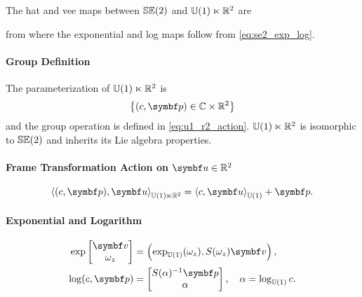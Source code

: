 The hat and vee maps between $\SEtwo$ and $\Uone \ltimes \mathbb{R}^2$ are
\begin{center}
\end{center}
from where the exponential and log maps follow from \eqref{eq:se2_exp_log}.

\begin{properties}[breakable, title={$\Uone\ltimes \mathbb{R}^2$ as a parameterization of $\SEtwo$}]
  \paragraph{Group Definition}
  The parameterization of $\Uone \ltimes \mathbb{R}^2$ is
  \begin{equation}
    \left\{ (c, \bp) \in \mathbb{C} \times \mathbb{R}^2 \right\}
  \end{equation}
  and the group operation is defined in \eqref{eq:u1_r2_action}. $\Uone \ltimes \mathbb{R}^2$ is isomorphic to $\SEtwo$ and inherits its Lie algebra properties.

  \paragraph{Frame Transformation Action on $\bu \in \mathbb{R}^{2}$}
  \begin{equation}
    \left\langle (c, \bp), \bu \right \rangle_{\Uone \ltimes \mathbb{R}^2} = \left \langle c, \bu \right \rangle_\Uone + \bp.
  \end{equation}

  \paragraph{Exponential and Logarithm}
  \begin{subequations}
    \begin{align}
      \label{eq:u1r2_exp}
      \exp \begin{bmatrix} \bv \\ \omega_z \end{bmatrix} & = \left(\exp_\Uone(\omega_z), S(\omega_z) \bv\right),      \\
      \label{eq:u1r2_log}
      \log (c, \bp)                   & = \begin{bmatrix} S(\alpha)^{-1} \bp \\ \alpha \end{bmatrix}, \quad \alpha = \log_\Uone c.
    \end{align}
  \end{subequations}
\end{properties}


